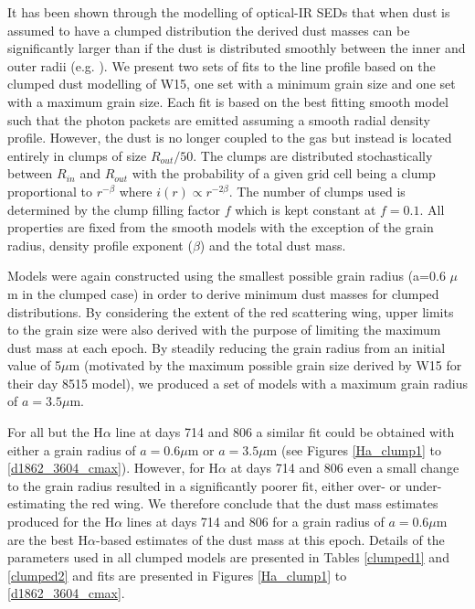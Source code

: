 \documentclass[useAMS,usenatbib,usegraphicx]{mnras}
\begin{document}
It has been shown through the modelling of optical-IR SEDs that when dust 
is assumed to have a clumped distribution the derived dust masses can be 
significantly larger than if the dust is distributed smoothly between the 
inner and outer radii (e.g. \citet{Owen2015}).  We present two sets of fits to the line profile based on 
the clumped dust modelling of W15, one set with a minimum grain size and one set with a maximum grain size.  Each fit is based on the best 
fitting smooth model such that the photon packets are emitted assuming a smooth 
radial density profile.  However, the dust is no longer coupled to the gas 
but instead is located entirely in clumps of size $R_{out}/50$.  The 
clumps are distributed stochastically between $R_{in}$ and $R_{out}$ with 
the probability of a given grid cell being a clump proportional to $r^{- 
\beta }$ where $i(r) \propto r^{-2 \beta}$.  The number of clumps used is 
determined by the clump filling factor $f$ which is kept constant at $f=0.1$.  All 
properties are fixed from the smooth models with the exception of the grain 
radius, density profile exponent ($\beta$) and the total dust mass.


Models were again constructed using the smallest possible grain radius (a=0.6 $\mu$m in the clumped case) in order to derive minimum dust masses for clumped distributions.  By considering the extent of the red scattering wing, upper limits to the grain size were also derived with the purpose of limiting the maximum  dust mass at each epoch.  By 
steadily reducing the grain radius from an initial value of 5$\mu$m 
(motivated by the maximum possible grain size derived by W15 for their day 
8515 model), we produced a set of models with a maximum grain radius of $a=3.5\mu$m.  

For all but the H$\alpha$ line at days 714 and 806 a similar fit could be obtained with either a grain radius of $a=0.6\mu$m or $a=3.5\mu$m (see Figures \ref{Ha_clump1} to 
\ref{d1862_3604_cmax}).  However, for H$\alpha$ at days 714 and 806  even a small change to the grain radius resulted in a significantly poorer fit, either 
over- or under-estimating the red wing. We therefore conclude that the dust mass estimates produced for the H$\alpha$ lines at days 714 and 
806 for a grain radius of $a=0.6\mu$m are the best H$\alpha$-based estimates of the dust mass 
at this epoch.  Details of the parameters used in all clumped models are
presented in Tables \ref{clumped1} and \ref{clumped2} and fits are presented in Figures \ref{Ha_clump1} to \ref{d1862_3604_cmax}.
\end{document}
